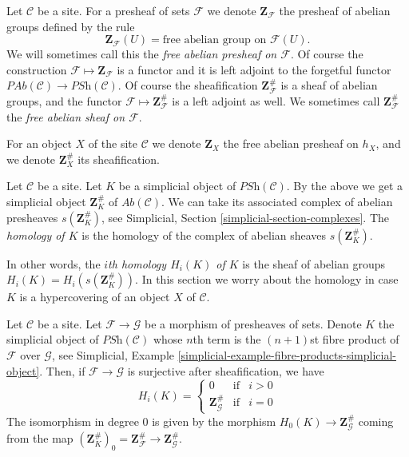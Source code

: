 \noindent
Let $\mathcal{C}$ be a site.
For a presheaf of sets $\mathcal{F}$ we denote $\mathbf{Z}_\mathcal{F}$
the presheaf of abelian groups defined by the rule
$$
\mathbf{Z}_\mathcal{F}(U) = \text{free abelian group on }\mathcal{F}(U).
$$
We will sometimes call this the {\it free abelian presheaf on $\mathcal{F}$}.
Of course the construction $\mathcal{F} \mapsto \mathbf{Z}_\mathcal{F}$
is a functor and it is left adjoint to the forgetful functor
$\textit{PAb}(\mathcal{C}) \to \textit{PSh}(\mathcal{C})$.
Of course the sheafification $\mathbf{Z}_\mathcal{F}^\#$ is
a sheaf of abelian groups, and the functor
$\mathcal{F} \mapsto \mathbf{Z}_\mathcal{F}^\#$ is a
left adjoint as well. We sometimes call $\mathbf{Z}_\mathcal{F}^\#$
the {\it free abelian sheaf on $\mathcal{F}$}.

\medskip\noindent
For an object $X$ of the site $\mathcal{C}$ we denote
$\mathbf{Z}_X$ the free abelian presheaf on $h_X$, and
we denote $\mathbf{Z}_X^\#$ its sheafification.

\begin{definition}
\label{definition-homology}
Let $\mathcal{C}$ be a site.
Let $K$ be a simplicial object of $\textit{PSh}(\mathcal{C})$.
By the above we get a simplicial object $\mathbf{Z}_K^\#$ of
$\textit{Ab}(\mathcal{C})$. We can take its associated
complex of abelian presheaves $s(\mathbf{Z}_K^\#)$, see
Simplicial, Section \ref{simplicial-section-complexes}.
The {\it homology of $K$} is the homology of the
complex of abelian sheaves $s(\mathbf{Z}_K^\#)$.
\end{definition}

\noindent
In other words, the {\it $i$th homology $H_i(K)$ of $K$}
is the sheaf of abelian groups $H_i(K) = H_i(s(\mathbf{Z}_K^\#))$.
In this section we worry about the homology in case $K$
is a hypercovering of an object $X$ of $\mathcal{C}$.

\begin{lemma}
\label{lemma-compare-cosk0}
Let $\mathcal{C}$ be a site.
Let $\mathcal{F} \to \mathcal{G}$ be a morphism
of presheaves of sets. Denote $K$ the simplicial
object of $\textit{PSh}(\mathcal{C})$ whose $n$th
term is the $(n + 1)$st fibre product of $\mathcal{F}$
over $\mathcal{G}$, see
Simplicial, Example \ref{simplicial-example-fibre-products-simplicial-object}.
Then, if $\mathcal{F} \to \mathcal{G}$ is surjective after
sheafification, we have
$$
H_i(K) =
\left\{
\begin{matrix}
0 & \text{if} & i > 0\\
\mathbf{Z}_\mathcal{G}^\# & \text{if} & i = 0
\end{matrix}
\right.
$$
The isomorphism in degree $0$ is given by the
morphism $H_0(K) \to \mathbf{Z}_\mathcal{G}^\#$
coming from the map $(\mathbf{Z}_K^\#)_0 =
\mathbf{Z}_\mathcal{F}^\# \to \mathbf{Z}_\mathcal{G}^\#$.
\end{lemma}

